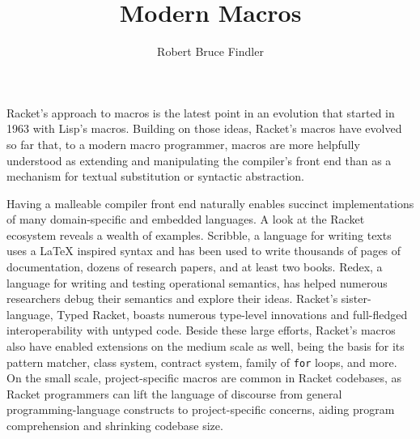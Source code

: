 \documentclass[runningheads]{llncs}
\begin{document}
\title{Modern Macros}
\author{Robert Bruce Findler}
%
\maketitle              %



Racket's approach to macros is the latest point in an evolution that
started in 1963 with Lisp's macros. Building on those ideas, Racket's
macros have evolved so far that, to a modern macro programmer, macros
are more helpfully understood as extending and manipulating the
compiler's front end than as a mechanism for textual substitution or
syntactic abstraction.

Having a malleable compiler front end naturally enables succinct
implementations of many domain-specific and embedded languages. A look
at the Racket ecosystem reveals a wealth of examples. Scribble, a
language for writing texts uses a \LaTeX{} inspired syntax and has
been used to write thousands of pages of documentation, dozens of
research papers, and at least two books. Redex, a language for writing
and testing operational semantics, has helped numerous researchers
debug their semantics and explore their ideas. Racket's
sister-language, Typed Racket, boasts numerous type-level innovations
and full-fledged interoperability with untyped code. Beside these
large efforts, Racket's macros also have enabled extensions on the
medium scale as well, being the basis for its pattern matcher, class
system, contract system, family of \texttt{for} loops, and more. On
the small scale, project-specific macros are common in Racket
codebases, as Racket programmers can lift the language of discourse
from general programming-language constructs to project-specific
concerns, aiding program comprehension and shrinking codebase size.
\end{document}
